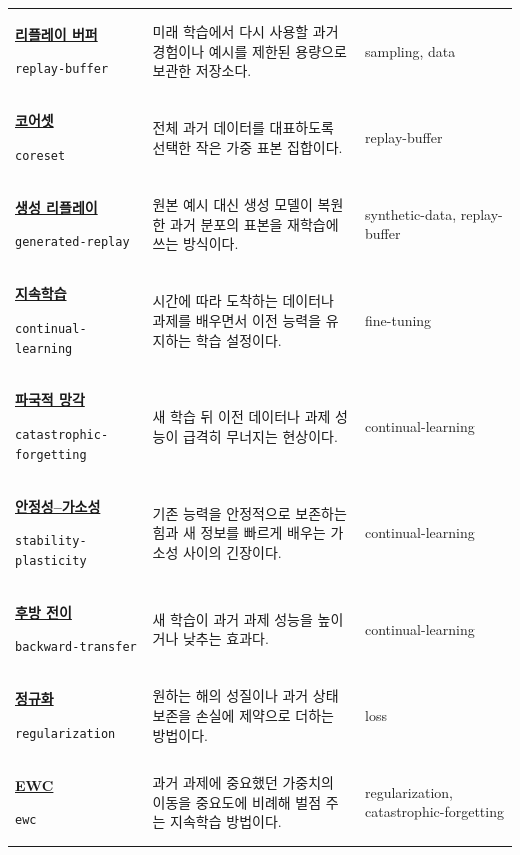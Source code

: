 \begin{longtable}{p{} p{} p{}}
\hypertarget{glossary:replay-buffer}{\hyperref[bg:replay-buffer]{\textbf{리플레이 버퍼}}} \newline\texttt{replay-buffer} & 미래 학습에서 다시 사용할 과거 경험이나 예시를 제한된 용량으로 보관한 저장소다. & \scriptsize sampling, data \\
\hypertarget{glossary:coreset}{\hyperref[bg:coreset]{\textbf{코어셋}}} \newline\texttt{coreset} & 전체 과거 데이터를 대표하도록 선택한 작은 가중 표본 집합이다. & \scriptsize replay-buffer \\
\hypertarget{glossary:generated-replay}{\hyperref[bg:generated-replay]{\textbf{생성 리플레이}}} \newline\texttt{generated-replay} & 원본 예시 대신 생성 모델이 복원한 과거 분포의 표본을 재학습에 쓰는 방식이다. & \scriptsize synthetic-data, replay-buffer \\
\hypertarget{glossary:continual-learning}{\hyperref[bg:continual-learning]{\textbf{지속학습}}} \newline\texttt{continual-learning} & 시간에 따라 도착하는 데이터나 과제를 배우면서 이전 능력을 유지하는 학습 설정이다. & \scriptsize fine-tuning \\
\hypertarget{glossary:catastrophic-forgetting}{\hyperref[bg:catastrophic-forgetting]{\textbf{파국적 망각}}} \newline\texttt{catastrophic-forgetting} & 새 학습 뒤 이전 데이터나 과제 성능이 급격히 무너지는 현상이다. & \scriptsize continual-learning \\
\hypertarget{glossary:stability-plasticity}{\hyperref[bg:stability-plasticity]{\textbf{안정성–가소성}}} \newline\texttt{stability-plasticity} & 기존 능력을 안정적으로 보존하는 힘과 새 정보를 빠르게 배우는 가소성 사이의 긴장이다. & \scriptsize continual-learning \\
\hypertarget{glossary:backward-transfer}{\hyperref[bg:backward-transfer]{\textbf{후방 전이}}} \newline\texttt{backward-transfer} & 새 학습이 과거 과제 성능을 높이거나 낮추는 효과다. & \scriptsize continual-learning \\
\hypertarget{glossary:regularization}{\hyperref[bg:regularization]{\textbf{정규화}}} \newline\texttt{regularization} & 원하는 해의 성질이나 과거 상태 보존을 손실에 제약으로 더하는 방법이다. & \scriptsize loss \\
\hypertarget{glossary:ewc}{\hyperref[bg:ewc]{\textbf{EWC}}} \newline\texttt{ewc} & 과거 과제에 중요했던 가중치의 이동을 중요도에 비례해 벌점 주는 지속학습 방법이다. & \scriptsize regularization, catastrophic-forgetting \\

\end{longtable}

